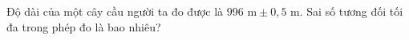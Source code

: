 \begin{ex}
Độ dài của một cây cầu người ta đo được là $996\text{ m}\pm0{,}5\text{ m}$. Sai số tương đối tối đa trong phép đo là bao nhiêu?
\end{ex}
